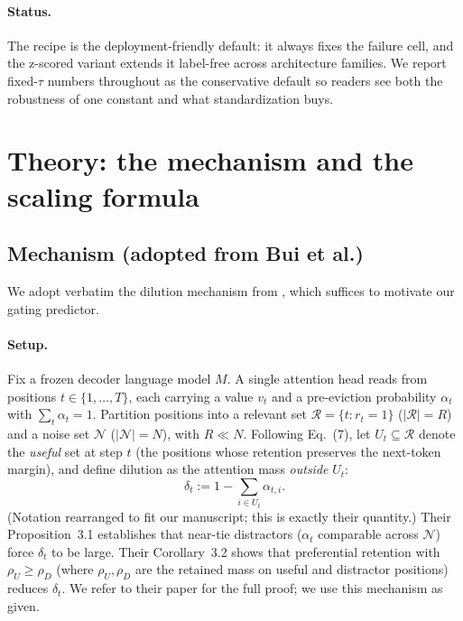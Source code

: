 \documentclass{article}
\begin{document}
\paragraph{Status.} The recipe is the deployment-friendly default: it always
fixes the failure cell, and the z-scored variant extends it label-free
across architecture families. We report fixed-$\tau$ numbers throughout as
the conservative default so readers see both the robustness of one
constant and what standardization buys.

\section{Theory: the mechanism and the scaling formula}
\label{sec:theory}

\subsection{Mechanism (adopted from Bui et al.)}

We adopt verbatim the dilution mechanism from \citet{arxiv260509649}, which
suffices to motivate our gating predictor.

\paragraph{Setup.} Fix a frozen decoder language model $M$. A single
attention head reads from positions $t \in \{1, \dots, T\}$, each carrying
a value $v_t$ and a pre-eviction probability $\alpha_t$ with $\sum_t
\alpha_t = 1$. Partition positions into a relevant set $\mathcal{R} = \{t:
r_t = 1\}$ ($|\mathcal{R}| = R$) and a noise set $\mathcal{N}$
($|\mathcal{N}| = N$), with $R \ll N$. Following \citet{arxiv260509649}
Eq.~(7), let $U_t \subseteq \mathcal{R}$ denote the \emph{useful} set at
step $t$ (the positions whose retention preserves the next-token margin),
and define dilution as the attention mass \emph{outside} $U_t$:
\begin{equation}
\label{eq:dilution}
\delta_t := 1 - \sum_{i \in U_t} \alpha_{t,i}.
\end{equation}
(Notation rearranged to fit our manuscript; this is exactly their
quantity.) Their Proposition~3.1 establishes that near-tie distractors
($\alpha_t$ comparable across $\mathcal{N}$) force $\delta_t$ to be large.
Their Corollary~3.2 shows that preferential retention with $\rho_U \geq
\rho_D$ (where $\rho_U, \rho_D$ are the retained mass on useful and
distractor positions) reduces $\delta_t$. We refer to their paper for the
full proof; we use this mechanism as given.
\end{document}
